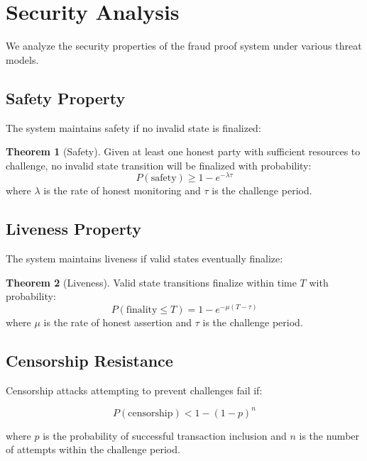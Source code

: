 \documentclass[11pt,a4paper]{article}
\theoremstyle{definition}
\newtheorem{theorem}{Theorem}[section]
\begin{document}
\section{Security Analysis}

We analyze the security properties of the fraud proof system under various threat models.

\subsection{Safety Property}

The system maintains safety if no invalid state is finalized:

\begin{theorem}[Safety]
Given at least one honest party with sufficient resources to challenge, no invalid state transition will be finalized with probability:
\begin{equation}
P(\text{safety}) \geq 1 - e^{-\lambda \tau}
\end{equation}
where $\lambda$ is the rate of honest monitoring and $\tau$ is the challenge period.
\end{theorem}

\subsection{Liveness Property}

The system maintains liveness if valid states eventually finalize:

\begin{theorem}[Liveness]
Valid state transitions finalize within time $T$ with probability:
\begin{equation}
P(\text{finality} \leq T) = 1 - e^{-\mu(T-\tau)}
\end{equation}
where $\mu$ is the rate of honest assertion and $\tau$ is the challenge period.
\end{theorem}

\subsection{Censorship Resistance}

Censorship attacks attempting to prevent challenges fail if:

\begin{equation}
P(\text{censorship}) < 1 - (1 - p)^n
\end{equation}

where $p$ is the probability of successful transaction inclusion and $n$ is the number of attempts within the challenge period.
\end{document}
